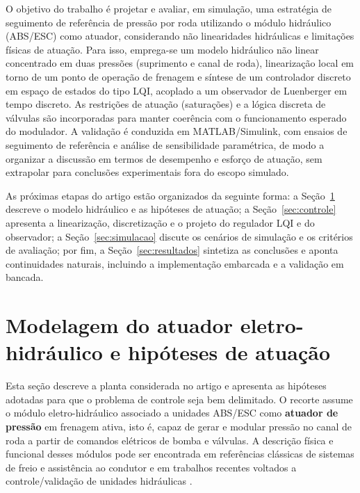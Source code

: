 \documentclass[a4paper]{ifacconf}
\begin{document}
O objetivo do trabalho é projetar e avaliar, em simulação, uma estratégia de seguimento de referência de pressão por roda utilizando o módulo hidráulico (ABS/ESC) como atuador, considerando não linearidades hidráulicas e limitações físicas de atuação. Para isso, emprega-se um modelo hidráulico não linear concentrado em duas pressões (suprimento e canal de roda), linearização local em torno de um ponto de operação de frenagem e síntese de um controlador discreto em espaço de estados do tipo LQI, acoplado a um observador de Luenberger em tempo discreto. As restrições de atuação (saturações) e a lógica discreta de válvulas são incorporadas para manter coerência com o funcionamento esperado do modulador. A validação é conduzida em MATLAB/Simulink, com ensaios de seguimento de referência e análise de sensibilidade paramétrica, de modo a organizar a discussão em termos de desempenho e esforço de atuação, sem extrapolar para conclusões experimentais fora do escopo simulado.

As próximas etapas do artigo estão organizados da seguinte forma: a Seção~\ref{sec:modelagem} descreve o modelo hidráulico e as hipóteses de atuação; a Seção~\ref{sec:controle}  apresenta a linearização, discretização e o projeto do regulador LQI e do observador; a Seção~\ref{sec:simulacao} discute os cenários de simulação e os critérios de avaliação; por fim, a Seção~\ref{sec:resultados} sintetiza as conclusões e aponta continuidades naturais, incluindo a implementação embarcada e a validação em bancada.

\section{Modelagem do atuador eletro-hidráulico e hipóteses de atuação}
\label{sec:modelagem}
Esta seção descreve a planta considerada no artigo e apresenta as hipóteses adotadas para que o problema de controle seja bem delimitado. O recorte assume o módulo eletro-hidráulico associado a unidades ABS/ESC como \textbf{atuador de pressão} em frenagem ativa, isto é, capaz de gerar e modular pressão no canal de roda a partir de comandos elétricos de bomba e válvulas. A descrição física e funcional desses módulos pode ser encontrada em referências clássicas de sistemas de freio e assistência ao condutor \cite{Konrad2014,Rudolf2011} e em trabalhos recentes voltados a controle/validação de unidades hidráulicas \cite{HouhuaJing2022,ZengYangHuang2023}.
\end{document}
